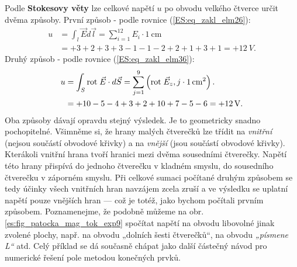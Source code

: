 \begin{example}
  Podle \textbf{Stokesovy věty} lze celkové napětí \(u\) po obvodu velkého čtverce určit dvěma 
  způsoby. První způsob - podle rovnice (\ref{ES:eq_zakl_elm26}):
  \begin{align*}
    u &= \int_l\vec{E}d\vec{l} = \sum\limits_{i=1}^{12}E_i\cdot\SI{1}{\cm}     \\
      &= +3 +2 +3 +3 - 1 - 1 -2 + 2 + 1 + 3 + 1 = + \SI{12}{V}.
  \end{align*}
  Druhý způsob - podle rovnice (\ref{ES:eq_zakl_elm36}):
  \begin{align*}
    u &= \int_S\rot{E} \cdot d\vec{S} 
       = \sum\limits_{j=1}^{9}\left(\rot{E}_z,j\cdot\SI{1}{\cm^2}\right).      \\
      &= + 10 - 5 - 4 + 3 + 2 + 10 + 7 - 5 - 6 = + \SI{12}{V}. 
  \end{align*}
  Oba způsoby dávají opravdu stejný výsledek. Je to geometricky snadno pochopitelné. Všimněme 
  si, že hrany malých čtverečků lze třídit na \emph{vnitřní} (nejsou součástí obvodové křivky) a na 
  \emph{vnější} (jsou součástí obvodové křivky). Kterákoli vnitřní hrana tvoří hranici mezi dvěma 
  sousedními čtverečky. Napětí této hrany přispívá do jednoho čtverečku v kladném smyslu, do 
  sousedního čtverečku v záporném smyslu. Při celkové sumaci počítané druhým způsobem se tedy 
  účinky všech vnitřních hran navzájem zcela zruší a ve výsledku se uplatní napětí pouze vnějších 
  hran — což je totéž, jako bychom počítali prvním způsobem. Poznamenejme, že podobně můžeme na 
  obr. \ref{es:fig_patocka_mag_tok_exp9} spočítat napětí na obvodu libovolné jinak zvolené plochy, 
  např. na obvodu „dolních šesti čtverečků“, na obvodu \emph{„písmene L“} atd. Celý příklad se dá 
  současně chápat jako další částečný návod pro numerické řešení pole metodou konečných prvků.
\end{example}

